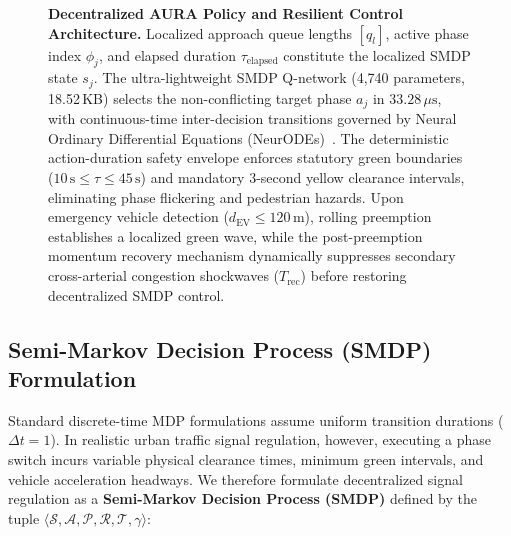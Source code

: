 \begin{figure}[!t]
{%
}
\caption{\textbf{Decentralized AURA Policy and Resilient Control Architecture.} Localized approach queue lengths $[q_l]$, active phase index $\phi_j$, and elapsed duration $\tau_{\text{elapsed}}$ constitute the localized SMDP state $s_j$. The ultra-lightweight SMDP Q-network (4,740 parameters, 18.52\,KB) selects the non-conflicting target phase $a_j$ in $33.28\,\mu\text{s}$, with continuous-time inter-decision transitions governed by Neural Ordinary Differential Equations (NeurODEs)~\cite{chen2018neural}. The deterministic action-duration safety envelope enforces statutory green boundaries ($10\,\text{s} \le \tau \le 45\,\text{s}$) and mandatory 3-second yellow clearance intervals, eliminating phase flickering and pedestrian hazards. Upon emergency vehicle detection ($d_{\text{EV}} \le 120\,\text{m}$), rolling preemption establishes a localized green wave, while the post-preemption momentum recovery mechanism dynamically suppresses secondary cross-arterial congestion shockwaves ($T_{\text{rec}}$) before restoring decentralized SMDP control.}
\label{fig:architecture}
\vspace{-2mm}
\end{figure}

\subsection{Semi-Markov Decision Process (SMDP) Formulation}
Standard discrete-time MDP formulations assume uniform transition durations ($\Delta t = 1$). In realistic urban traffic signal regulation, however, executing a phase switch incurs variable physical clearance times, minimum green intervals, and vehicle acceleration headways. We therefore formulate decentralized signal regulation as a \textbf{Semi-Markov Decision Process (SMDP)} defined by the tuple $\langle \mathcal{S}, \mathcal{A}, \mathcal{P}, \mathcal{R}, \mathcal{T}, \gamma \rangle$:

